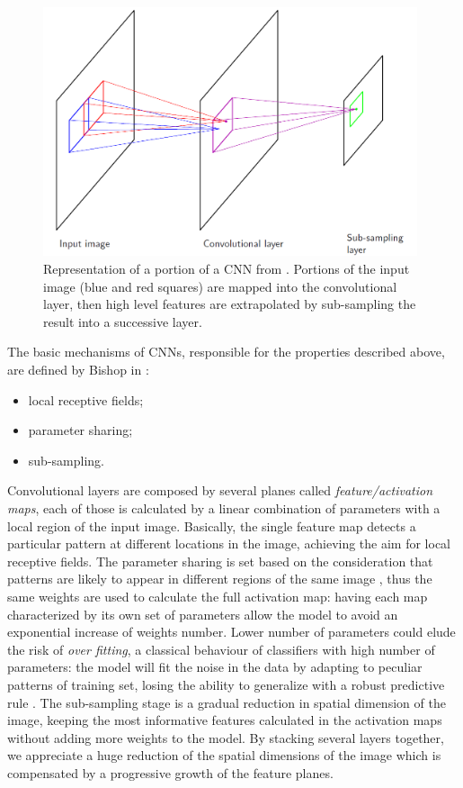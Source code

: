 \documentclass[../main.tex]{subfiles}
\begin{document}
\begin{figure}[H] 
\begin{center}
\includegraphics[width=11cm]{images/cnn-layer.png}
\caption{\small{Representation of a portion of a  CNN from \cite{bishop2006pattern}. Portions of the input image (blue and red squares) are mapped into the convolutional layer, then high level features are extrapolated by sub-sampling the result into a successive layer. }}\label{fig:cnn}
\end{center}
\end{figure}
The basic mechanisms of CNNs, responsible for the properties described above, are defined by Bishop in \cite{bishop2006pattern}:

\begin{itemize}
    \item local receptive fields;
    \item parameter sharing;
    \item sub-sampling.
\end{itemize}

Convolutional layers are composed by several planes called \textit{feature/activation maps}, each of those is calculated by a linear combination of parameters with a local region of the input image.
Basically, the single feature map detects a particular pattern at different locations in the image, achieving the aim for local receptive fields.
The parameter sharing is set based on the consideration that patterns are likely to appear in different regions of the same image \cite{o2015introduction-cnn}, thus the same weights are used to calculate the full activation map: having each map characterized by its own set of parameters allow the model to avoid an exponential increase of weights number. 
Lower number of parameters could elude the risk of \textit{over fitting}, a classical behaviour of classifiers with high number of parameters: the model will fit the noise in the data by adapting to peculiar patterns of training set, losing the ability to generalize with a robust predictive rule \cite{dietterich1995overfitting}.
The sub-sampling stage is a  gradual reduction in spatial dimension of the image, keeping the most informative features calculated in the activation maps without adding more weights to the model.
By stacking several layers together, we appreciate a huge reduction of the spatial dimensions of the image which is compensated by a progressive growth of the feature planes.
\end{document}
